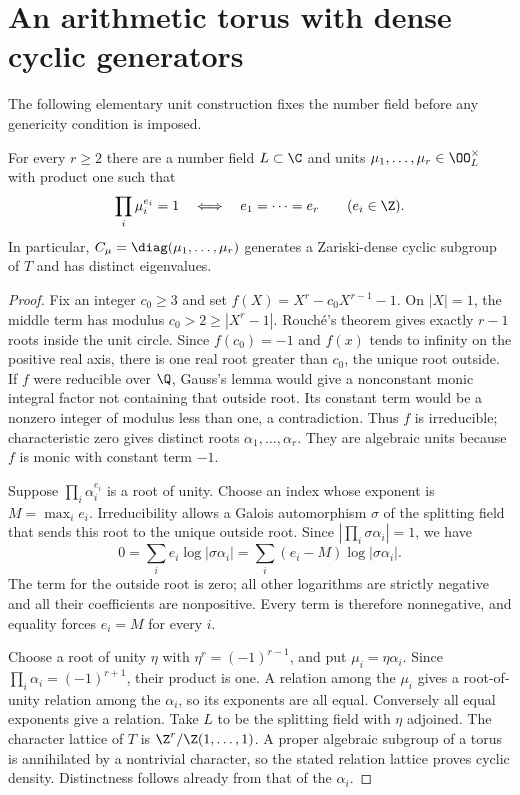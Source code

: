 \section{An arithmetic torus with dense cyclic generators}\label{sec:arithmetic}
The following elementary unit construction fixes the number field before
any genericity condition is imposed.

\begin{lemma}\label{lem:units}
For every $r\geq2$ there are a number field $L\subset\C$ and units
$\mu_1,\ldots,\mu_r\in\OO_L^\times$ with product one such that
\[
 \prod_i\mu_i^{e_i}=1\quad\Longleftrightarrow\quad
 e_1=\cdots=e_r\qquad(e_i\in\Z).
\]
In particular, $C_\mu=\diag(\mu_1,\ldots,\mu_r)$ generates a Zariski-dense
cyclic subgroup of $T$ and has distinct eigenvalues.
\end{lemma}
\begin{proof}
Fix an integer $c_0\geq3$ and set $f(X)=X^r-c_0X^{r-1}-1$.
On $|X|=1$, the middle term has modulus $c_0>2\geq|X^r-1|$.
Rouch\'e's theorem gives exactly $r-1$ roots inside the unit circle.
Since $f(c_0)=-1$ and $f(x)$ tends to infinity on the positive real axis,
there is one real root greater than $c_0$, the unique root outside.
If $f$ were reducible over $\Q$, Gauss's lemma would give a nonconstant
monic integral factor not containing that outside root. Its constant term
would be a nonzero integer of modulus less than one, a contradiction.
Thus $f$ is irreducible; characteristic zero gives distinct roots
$\alpha_1,\ldots,\alpha_r$. They are algebraic units because $f$ is monic
with constant term $-1$.

Suppose $\prod_i\alpha_i^{e_i}$ is a root of unity. Choose an index whose
exponent is $M=\max_i e_i$. Irreducibility allows a Galois automorphism
$\sigma$ of the splitting field that sends this root to the unique outside
root. Since $|\prod_i\sigma\alpha_i|=1$, we have
\[
 0=\sum_i e_i\log|\sigma\alpha_i|
   =\sum_i(e_i-M)\log|\sigma\alpha_i|.
\]
The term for the outside root is zero; all other logarithms are strictly
negative and all their coefficients are nonpositive. Every term is
therefore nonnegative, and equality forces $e_i=M$ for every $i$.

Choose a root of unity $\eta$ with $\eta^r=(-1)^{r-1}$, and put
$\mu_i=\eta\alpha_i$. Since $\prod_i\alpha_i=(-1)^{r+1}$, their product is
one. A relation among the $\mu_i$ gives a root-of-unity relation among the
$\alpha_i$, so its exponents are all equal. Conversely all equal exponents
give a relation. Take $L$ to be the splitting field with $\eta$ adjoined.
The character lattice of $T$ is $\Z^r/\Z(1,\ldots,1)$. A proper algebraic
subgroup of a torus is annihilated by a nontrivial character, so the stated
relation lattice proves cyclic density. Distinctness follows already from
that of the $\alpha_i$.
\end{proof}

